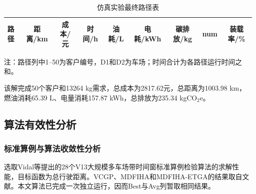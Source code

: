 \documentclass{setp-new}
\begin{document}
\begin{table}[H]
\centering
\caption{仿真实验最终路径表}
\label{tab:final-solution}
\scriptsize
\renewcommand{\arraystretch}{0.92}
\setlength{\tabcolsep}{1.0pt}
\begin{tabular*}{\textwidth}{@{\extracolsep{\fill}}lrrrrrrrr@{}}
\toprule
路径 & \multicolumn{1}{c}{距离/km} & \multicolumn{1}{c}{成本/元} & \multicolumn{1}{c}{时间/h} & \multicolumn{1}{c}{油耗/L} & \multicolumn{1}{c}{电耗/kWh} & \multicolumn{1}{c}{碳排放/kg} & \multicolumn{1}{c}{num} & \multicolumn{1}{c}{装载率/\%}\\
\midrule

\end{tabular*}
\vspace{1pt}
\parbox{\textwidth}{\footnotesize 注：路径列中1--50为客户编号，D1和D2为车场；时间合计为各路径运行时间之和。}
\end{table}

该解完成50个客户和13264 kg需求，总成本为2817.62元，总距离为1003.98 km，
燃油消耗65.39 L、电量消耗157.87 kWh，总排放为235.34 kgCO$_2$e。

\subsection{算法有效性分析}

\subsubsection{标准算例与算法收敛性分析}

选取Vidal等提出的28个V13大规模多车场带时间窗标准算例检验算法的求解性能，目标函数为总行驶距离。VCGP、MDFIHA和MDFIHA-ETGA的结果取自文献。本文算法已完成一次独立运行，因而Best与Avg列暂取相同结果。
\end{document}
